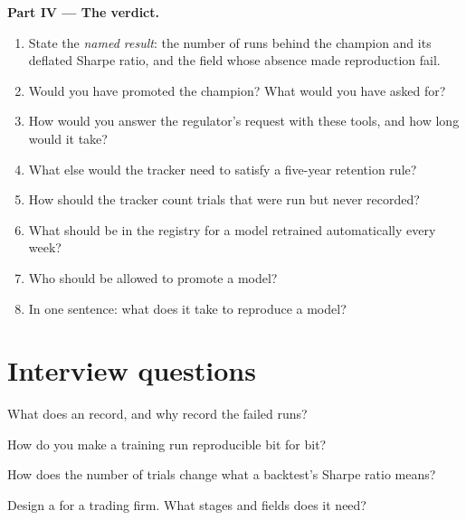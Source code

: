 \begin{problem}
\medskip\noindent\textbf{Part IV --- The verdict.}
\begin{enumerate}[resume]
\item State the \emph{named result}: the number of runs behind the champion and its deflated Sharpe ratio, and the field whose
absence made reproduction fail.
\item Would you have promoted the champion? What would you have asked for?
\item How would you answer the regulator's request with these tools, and how long would it take?
\item What else would the tracker need to satisfy a five-year retention rule?
\item How should the tracker count trials that were run but never recorded?
\item What should be in the registry for a model retrained automatically every week?
\item Who should be allowed to promote a model?
\item In one sentence: what does it take to reproduce a model?
\end{enumerate}
\end{problem}

\section{Interview questions}

\begin{interviewq}\label{iq:ml:experiment-tracking-and-reproducibility:1}
What does an  record, and why record the failed runs?
\end{interviewq}

\begin{interviewq}\label{iq:ml:experiment-tracking-and-reproducibility:2}
How do you make a training run reproducible bit for bit?
\end{interviewq}

\begin{interviewq}\label{iq:ml:experiment-tracking-and-reproducibility:3}
How does the number of trials change what a backtest's Sharpe ratio means?
\end{interviewq}

\begin{interviewq}\label{iq:ml:experiment-tracking-and-reproducibility:4}
Design a  for a trading firm. What stages and fields does it need?
\end{interviewq}

